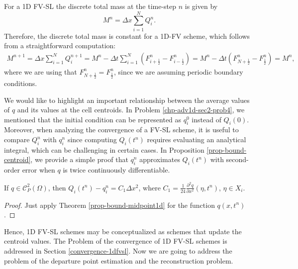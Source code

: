 For a 1D FV-SL the discrete total mass at the time-step $n$ is given by
\begin{equation}
	\label{1d-fv-mass}
	M^n =  \Delta x \sum_{i=1}^N Q_i^n.
\end{equation}
Therefore, the discrete total mass is constant for a 1D-FV scheme,
which follows from a straightforward computation:
\begin{align*}
	M^{n+1} =  \Delta x \sum_{i=1}^N Q_i^{n+1}
					= M^{n} - \Delta t  \sum_{i=1}^N (F^n_{i+\frac{1}{2}}- F^n_{i-\frac{1}{2}})
					= M^{n} - \Delta t (F^n_{N+\frac{1}{2}}- F^n_{\frac{1}{2}})
					= M^{n},
\end{align*}
where we are using that $F^n_{N+\frac{1}{2}} = F^n_{\frac{1}{2}}$, since we are assuming periodic boundary
conditions.

We would like to highlight an important relationship between the average values of $q$ and
its values at the cell centroids. In Problem \ref{chp-adv1d-sec2-prob4}, we mentioned that 
the initial condition can be represented as $q_i^0$ instead of $Q_i(0)$.
Moreover, when analyzing the convergence of a FV-SL scheme, it is useful
to compare $Q_i^n$ with $q_i^n$ since computing $Q_i(t^n)$ requires evaluating an analytical
integral, which can be challenging in certain cases. In Proposition \ref{prop-bound-centroid},
we provide a simple proof that $q_i^n$ approximates $Q_i(t^n)$ with second-order error
when $q$ is twice continuously differentiable.
\begin{prop}
	\label{prop-bound-centroid}
	If $q \in \mathcal{C}^2_P(\Omega)$, then $Q_i(t^n)-q_i^n = C_1 \Delta x^2$, where 
	$C_1 = \frac{1}{24}\frac{\partial^2 q}{\partial x^2} (\eta, t^n)$,  $\eta \in X_i$.
\end{prop}
\begin{proof}
	Just apply Theorem \ref{prop-bound-midpoint1d} for the function $q(x,t^n)$.	
\end{proof}
Hence, 1D FV-SL schemes may be conceptualized as schemes that update the centroid values.
The Problem of the convergence of 1D FV-SL schemes is addressed in Section \ref{convergence-1dfvsl}.
Now we are going to address the problem of the departure point estimation and the reconstruction problem.

